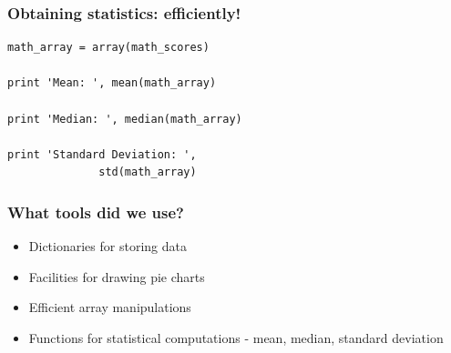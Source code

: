 \documentclass[14pt,compress]{beamer}
\newcounter{time}
\newcommand{\inctime}[1]{\addtocounter{time}{#1}{\tiny \thetime\ m}}
\begin{document}
\begin{frame}[fragile]
  \frametitle{Obtaining statistics: efficiently!}
  \begin{lstlisting}
math_array = array(math_scores)

print 'Mean: ', mean(math_array)

print 'Median: ', median(math_array)

print 'Standard Deviation: ',
              std(math_array)
  \end{lstlisting}
  \inctime{5}
\end{frame}

\begin{frame}[fragile]
  \frametitle{What tools did we use?}
  \begin{itemize}
   \item Dictionaries for storing data
   \item Facilities for drawing pie charts
   \item Efficient array manipulations
   \item Functions for statistical computations - mean, median, standard deviation
  \end{itemize}
\end{frame}
\end{document}
